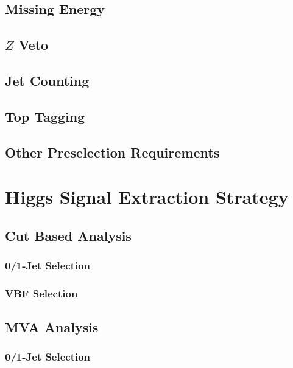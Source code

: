 \documentclass{cmspaper}
\begin{document}
   \subsection{Missing Energy} 
     \label{sec:sel_met}
     
   \subsection{$Z$ Veto}
     \label{sec:sel_zveto}
     
   \subsection{Jet Counting} 
     \label{sec:sel_jets}
     
  \subsection{Top Tagging}
     \label{sec:sel_toptag}
     
   \subsection{Other Preselection Requirements}
     \label{sec:sel_other}
     

\section{Higgs Signal Extraction Strategy}
%   
   \label{sec:signal_selection}
   \subsection{Cut Based Analysis}
     \label{sec:anal_cutbased}
    \subsubsection{0/1-Jet Selection}
      \label{sec:sel_zerojet}
%      
     \subsubsection{VBF Selection}
       \label{sec:sel_vbf}
%       
   \subsection{MVA Analysis}
     \label{sec:anal_mva}
%     
     \subsubsection{0/1-Jet Selection}
       \label{sec:sel_mva_zero_one_jet}
\end{document}
